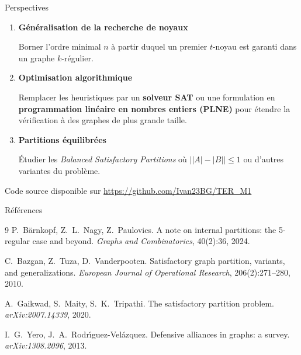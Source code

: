 \begin{frame}{Perspectives}
  \begin{enumerate}
    \item \textbf{G\'en\'eralisation de la recherche de noyaux}

    Borner l'ordre minimal $n$ \`a partir duquel un premier $t$-noyau est garanti dans un graphe $k$-r\'egulier.

    \bigskip

    \item \textbf{Optimisation algorithmique}

    Remplacer les heuristiques par un \textbf{solveur SAT} ou une formulation en \textbf{programmation lin\'eaire en nombres entiers (PLNE)} pour \'etendre la v\'erification \`a des graphes de plus grande taille.

    \bigskip

    \item \textbf{Partitions \'equilibr\'ees}

    \'Etudier les \emph{Balanced Satisfactory Partitions} o\`u $\bigl||A| - |B|\bigr| \leq 1$ ou d'autres variantes du probl\`eme.
  \end{enumerate}

  \bigskip
  \begin{center}
    {\small Code source disponible sur \url{https://github.com/Ivan23BG/TER_M1}}
  \end{center}
\end{frame}

\begin{frame}{R\'ef\'erences}
  \begin{thebibliography}{9}
      P.\ B\"arnkopf, Z.\ L.\ Nagy, Z.\ Paulovics.
      \newblock A note on internal partitions: the 5-regular case and beyond.
      \newblock \textit{Graphs and Combinatorics}, 40(2):36, 2024.

      C.\ Bazgan, Z.\ Tuza, D.\ Vanderpooten.
      \newblock Satisfactory graph partition, variants, and generalizations.
      \newblock \textit{European Journal of Operational Research}, 206(2):271--280, 2010.

      A.\ Gaikwad, S.\ Maity, S.\ K.\ Tripathi.
      \newblock The satisfactory partition problem.
      \newblock \textit{arXiv:2007.14339}, 2020.

      I.\ G.\ Yero, J.\ A.\ Rodr\'{\i}guez-Vel\'azquez.
      \newblock Defensive alliances in graphs: a survey.
      \newblock \textit{arXiv:1308.2096}, 2013.
  \end{thebibliography}
\end{frame}

